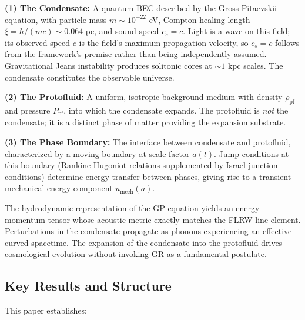 \documentclass[11pt,a4paper]{article}
\newcommand{\umech}{\ensuremath{u_{\mathrm{mech}}}}
\theoremstyle{definition}
\theoremstyle{remark}
\begin{document}
\textbf{(1) The Condensate:} A quantum BEC described by the Gross-Pitaevskii equation, with particle mass $m \sim 10^{-22}$ eV, Compton healing length $\xi = \hbar/(mc) \sim 0.064$ pc, and sound speed $c_s = c$. Light is a wave on this field; its observed speed $c$ is the field's maximum propagation velocity, so $c_s = c$ follows from the framework's premise rather than being independently assumed. Gravitational Jeans instability produces solitonic cores at $\sim 1$ kpc scales. The condensate constitutes the observable universe.

\textbf{(2) The Protofluid:} A uniform, isotropic background medium with density $\rho_{\mathrm{pf}}$ and pressure $P_{\mathrm{pf}}$, into which the condensate expands. The protofluid is \emph{not} the condensate; it is a distinct phase of matter providing the expansion substrate.

\textbf{(3) The Phase Boundary:} The interface between condensate and protofluid, characterized by a moving boundary at scale factor $a(t)$. Jump conditions at this boundary (Rankine-Hugoniot relations supplemented by Israel junction conditions) determine energy transfer between phases, giving rise to a transient mechanical energy component $\umech(a)$.

The hydrodynamic representation of the GP equation yields an energy-momentum tensor whose acoustic metric exactly matches the FLRW line element. Perturbations in the condensate propagate as phonons experiencing an effective curved spacetime. The expansion of the condensate into the protofluid drives cosmological evolution without invoking GR as a fundamental postulate.

\subsection{Key Results and Structure}
\label{sec:key_results_overview}

This paper establishes:
\end{document}
